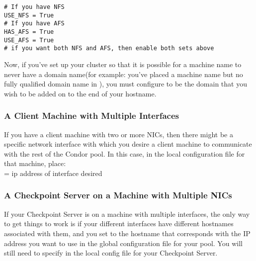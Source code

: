 \begin{verbatim}
# If you have NFS
USE_NFS = True
# If you have AFS
HAS_AFS = True
USE_AFS = True
# if you want both NFS and AFS, then enable both sets above
\end{verbatim}

Now, if you've set up your cluster so that it is possible for a machine
name to never have a domain name(for example: you've placed a machine
name but no fully qualified domain name in ), you must
configure  to be the domain that you wish
to be added on to the end of your hostname.

\subsubsection{A Client Machine with Multiple Interfaces}

If you have a client machine with two or more NICs, then there might be
a specific network interface with which you desire a client machine to
communicate with the rest of the Condor pool. In this case, in the local
configuration file for that machine, place: \\ 
 = ip address of interface desired \\

\subsubsection{A Checkpoint Server on a Machine with Multiple NICs}

If your Checkpoint Server is on a machine with multiple interfaces,
the only way to get things to work is if your different interfaces
have different hostnames associated with them, and you set
 to the hostname that corresponds with the
IP address you want to use in the global configuration file for your pool.
You will still need to specify  in the local
config file for your Checkpoint Server.


